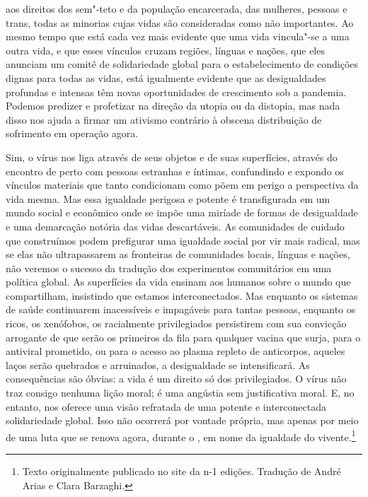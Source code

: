 \begin{multicols}{2}
aos direitos dos sem"-teto e da população encarcerada, das mulheres,
pessoas {} e trans, todas as minorias cujas vidas são
consideradas como não importantes. Ao mesmo tempo que está cada vez mais
evidente que uma vida vincula"-se a uma outra vida, e que esses vínculos
cruzam regiões, línguas e nações, que eles anunciam um comitê de
solidariedade global para o estabelecimento de condições dignas para
todas as vidas, está igualmente evidente que as desigualdades profundas
e intensas têm novas oportunidades de crescimento sob a pandemia.
Podemos predizer e profetizar na direção da utopia ou da distopia, mas
nada disso nos ajuda a firmar um ativismo contrário à obscena
distribuição de sofrimento em operação agora.

Sim, o vírus nos liga através de seus objetos e de suas superfícies,
através do encontro de perto com pessoas estranhas e íntimas,
confundindo e expondo os vínculos materiais que tanto condicionam como
põem em perigo a perspectiva da vida mesma. Mas essa igualdade perigosa
e potente é transfigurada em um mundo social e econômico onde se impõe
uma miríade de formas de desigualdade e uma demarcação notória das vidas
descartáveis. As comunidades de cuidado que construímos podem prefigurar
uma igualdade social por vir mais radical, mas se elas não ultrapassarem
as fronteiras de comunidades locais, línguas e nações, não veremos o
sucesso da tradução dos experimentos comunitários em uma política
global. As superfícies da vida ensinam aos humanos sobre o mundo que
compartilham, insistindo que estamos interconectados. Mas enquanto os
sistemas de saúde continuarem inacessíveis e impagáveis para tantas
pessoas, enquanto os ricos, os xenófobos, os racialmente privilegiados
persistirem com sua convicção arrogante de que serão os primeiros da
fila para qualquer vacina que surja, para o antiviral prometido, ou para
o acesso ao plasma repleto de anticorpos, aqueles laços serão quebrados
e arruinados, a desigualdade se intensificará. As consequências são
óbvias: a vida é um direito só dos privilegiados. O vírus não traz
consigo nenhuma lição moral; é uma angústia sem justificativa moral. E,
no entanto, nos oferece uma visão refratada de uma potente e
interconectada solidariedade global. Isso não ocorrerá por vontade
própria, mas apenas por meio de uma luta que se renova agora, durante o
{}, em nome da igualdade do vivente.\footnote[1]{Texto originalmente publicado no site da n-1 edições. Tradução de André Arias e Clara Barzaghi.}
\end{multicols}

